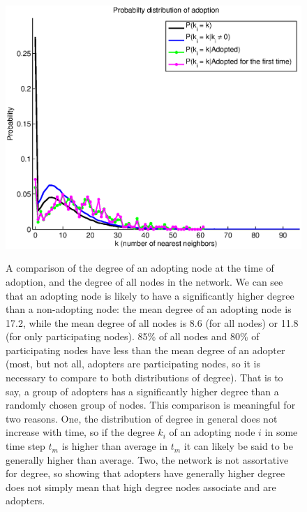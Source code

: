\documentclass[12pt]{article}
\begin{document}
\begin{figure}[H]
\includegraphics[trim = 0cm 0cm 0cm 0cm, width = .9\textwidth]{Graficos/PkGivenAdopt.eps}
\label{fig:PkGivenAdopt}
\caption{A comparison of the degree of an adopting node at the time of adoption, and the degree of all nodes in the network. We can see that an adopting node is likely to have a significantly higher degree than a non-adopting node: the mean degree of an adopting node is 17.2, while the mean degree of all nodes is 8.6 (for all nodes) or 11.8 (for only participating nodes). 85\% of all nodes and 80\% of participating nodes have less than the mean degree of an adopter (most, but not all,  adopters are participating nodes, so it is necessary to compare to both distributions of degree). That is to say, a group of adopters has a significantly higher degree than a randomly chosen group of nodes. \newline This comparison is meaningful for two reasons. One, the distribution of degree in general does not increase with time, so if the degree \(k_i\) of an adopting node \(i\) in some time step \(t_m\) is higher than average in \(t_m\) it can likely be said to be generally higher than average. Two, the network is not assortative for degree, so showing that adopters have generally higher degree does not simply mean that high degree nodes associate and are adopters.}
\label{fig:PkgA}
\end{figure}
\end{document}
